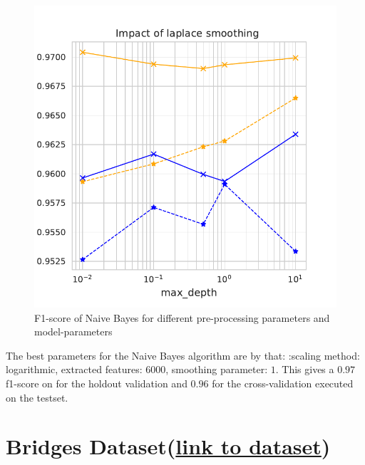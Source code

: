 \documentclass[11pt]{article}
\begin{document}
\begin{figure}
\begin{minipage}[l]{0.3\textwidth}
\end{minipage}
\begin{minipage}[l]{0.3\textwidth}
\includegraphics[width=1\linewidth]{email_spam/nb_smoother.pdf}
\end{minipage}
   \caption{F1-score of Naive Bayes for different pre-processing parameters and model-parameters}
\label{spamfig_fig3}
\end{figure}

The best parameters for the Naive Bayes algorithm are by that: :scaling method: logarithmic, extracted features: $6000$, smoothing parameter: $1$. This gives a $0.97$ f1-score on for the holdout validation and $0.96$ for the cross-validation executed on the testset.




\section{Bridges Dataset(\href{https://archive.ics.uci.edu/ml/datasets/Pittsburgh+Bridges}{link to dataset})}
\end{document}
